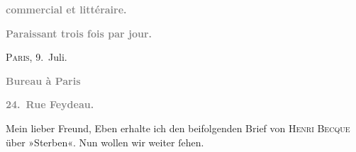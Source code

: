 \pstart
           \begin{otherlanguage}{french}\textcolor{gray}{\textbf{commercial et littéraire.}}\end{otherlanguage}\pend
           
\pstart
           \begin{otherlanguage}{french}\textcolor{gray}{\textbf{\textbf{Paraissant trois fois par jour.}}}\end{otherlanguage}\hfill \textsc{Paris}, 9. Juli.\pend
           
\pstart
           \begin{otherlanguage}{french}\textcolor{gray}{\textbf{\textbf{Bureau à Paris}}}\end{otherlanguage}\pend
           
\pstart
           \begin{otherlanguage}{french}\textcolor{gray}{\textbf{\textbf{24. Rue Feydeau.}}}\end{otherlanguage}\pend
           
\pstart\center{}Mein lieber Freund,\pend\vspace{0.5em}
\pstart
           Eben erhalte ich den beifolgenden Brief von \textsc{Henri Becque} über »Sterben«. Nun wollen wir weiter{ }ſehen.\pend
           
